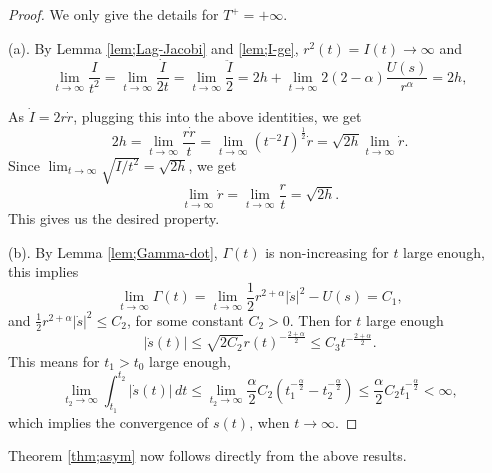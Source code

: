 \documentclass[11pt]{amsart}
\newcommand{\al}{\alpha}
\newcommand{\ey}{\frac{1}{2}}
\theoremstyle{plain}
\theoremstyle{definition}
\theoremstyle{remark}
\begin{document}
\begin{proof}
We only give the details for $T^+=+\infty$.

(a). By Lemma \ref{lem;Lag-Jacobi} and \ref{lem;I-ge}, $r^2(t) = I(t) \to \infty$ and
\begin{equation}
\label{eq;ddot-dot-I} \lim_{t \to \infty} \frac{I}{t^2} = \lim_{t \to \infty} \frac{\dot{I}}{2t} = \lim_{t \to \infty} \frac{\ddot{I}}{2} = 2h+  \lim_{t \to \infty} 2(2-\al)\frac{U(s)}{r^{\al}} = 2h,
\end{equation} 

As $\dot{I} = 2 r \dot{r}$, plugging this into the above identities, we get 
$$2h = \lim_{t \to \infty} \frac{r \dot{r}}{t} = \lim_{t \to \infty} \left(  t^{-2} I\right)^{\ey} \dot{r} = \sqrt{2h} \lim_{ t \to \infty} \dot{r}. $$
Since $\lim_{t \to \infty} \sqrt{I/t^2} = \sqrt{2h}$, we get 
$$ \lim_{t \to \infty} \dot{r} = \lim_{t \to \infty} \frac{r}{t} = \sqrt{2h}. $$
This gives us the desired property. 

(b). By Lemma \ref{lem;Gamma-dot}, $\Gamma(t)$ is non-increasing for $t$ large enough, this implies   
\begin{equation}
\label{eq;Gm-lim} \lim_{t \to \infty} \Gamma(t) = \lim_{t \to \infty} \ey r^{2 +\al}|\dot{s}|^2 - U(s) = C_1,
\end{equation}
and $\ey r^{2 +\al} |\dot{s}|^2 \le C_2$, for some constant $C_2 >0$. Then for $t$ large enough
\begin{equation}
\label{eq;s-dot-le} |\dot{s}(t)| \le \sqrt{2 C_2} r(t)^{-\frac{2 + \al}{2}} \le C_3 t^{-\frac{2 +\al}{2}}.
\end{equation}
This means for $t_1 >t_0$ large enough, 
$$ \lim_{t_2 \to \infty} \int_{t_1}^{t_2} |\dot s(t) | \,dt \le \lim_{t_2 \to \infty} \frac{\al}{2} C_2 (t_1^{-\frac{\al}{2}}- t_2^{-\frac{\al}{2}}) \le \frac{\al}{2} C_2 t_1^{-\frac{\al}{2}} < \infty,
$$
which implies the convergence of $s(t)$, when $t \to \infty$. 
\end{proof}

Theorem \ref{thm;asym} now follows directly from the above results.  
 
\end{document}
